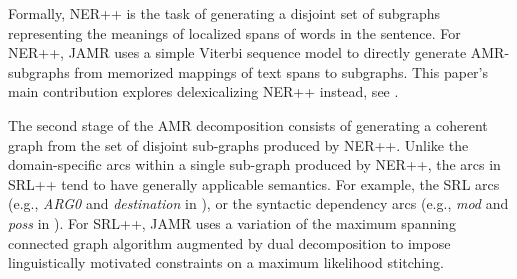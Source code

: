 \documentclass[11pt]{article}
\newcommand\e[1]{\textit{#1}} %
\begin{document}
Formally, NER++ is the task of generating a disjoint set of subgraphs representing the meanings of localized spans of words in the sentence.
For NER++, JAMR uses a simple Viterbi sequence model to directly generate AMR-subgraphs from memorized mappings of text spans to subgraphs.
This paper's main contribution explores delexicalizing NER++ instead, see .


The second stage of the AMR decomposition consists of generating a coherent graph
  from the set of disjoint sub-graphs produced by NER++.
Unlike the domain-specific arcs within a single sub-graph produced by NER++, the
  arcs in SRL++ tend to have generally applicable semantics.
For example, the SRL arcs (e.g., \e{ARG0} and \e{destination} in ),
  or the syntactic dependency arcs (e.g., \e{mod} and \e{poss} in ).
For SRL++, JAMR uses a variation of the maximum spanning connected graph algorithm augmented by dual decomposition to impose linguistically motivated constraints on a maximum likelihood stitching. 
\end{document}
